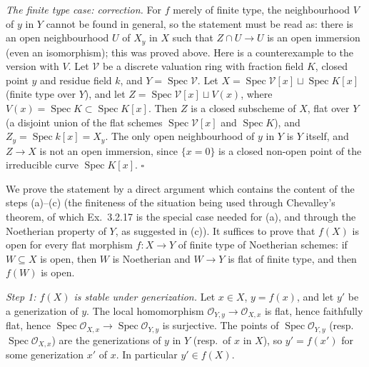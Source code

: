 \documentclass[11pt]{article}
\begin{document}
\emph{The finite type case: correction.} For $f$ merely of finite type, the neighbourhood $V$ of $y$ in $Y$ cannot be found in general, so the statement must be read as: there is an open neighbourhood $U$ of $X_y$ in $X$ such that $Z\cap U\to U$ is an open immersion (even an isomorphism); this was proved above. Here is a counterexample to the version with $V$. Let $\mathcal V$ be a discrete valuation ring with fraction field $K$, closed point $y$ and residue field $k$, and $Y=\operatorname{Spec}\mathcal V$. Let $X=\operatorname{Spec}\mathcal V[x]\sqcup\operatorname{Spec}K[x]$ (finite type over $Y$), and let $Z=\operatorname{Spec}\mathcal V[x]\sqcup V(x)$, where $V(x)=\operatorname{Spec}K\subset\operatorname{Spec}K[x]$. Then $Z$ is a closed subscheme of $X$, flat over $Y$ (a disjoint union of the flat schemes $\operatorname{Spec}\mathcal V[x]$ and $\operatorname{Spec}K$), and $Z_y=\operatorname{Spec}k[x]=X_y$. The only open neighbourhood of $y$ in $Y$ is $Y$ itself, and $Z\to X$ is not an open immersion, since $\{x=0\}$ is a closed non-open point of the irreducible curve $\operatorname{Spec}K[x]$. \hfill$\square$

\pf
We prove the statement by a direct argument which contains the content of the steps (a)--(c) (the finiteness of the situation being used through Chevalley's theorem, of which Ex.~3.2.17 is the special case needed for (a), and through the Noetherian property of $Y$, as suggested in (c)). It suffices to prove that $f(X)$ is open for every flat morphism $f:X\to Y$ of finite type of Noetherian schemes: if $W\subseteq X$ is open, then $W$ is Noetherian and $W\to Y$ is flat of finite type, and then $f(W)$ is open.

\emph{Step 1: $f(X)$ is stable under generization.} Let $x\in X$, $y=f(x)$, and let $y'$ be a generization of $y$. The local homomorphism $\mathcal O_{Y,y}\to\mathcal O_{X,x}$ is flat, hence faithfully flat, hence $\operatorname{Spec}\mathcal O_{X,x}\to\operatorname{Spec}\mathcal O_{Y,y}$ is surjective. The points of $\operatorname{Spec}\mathcal O_{Y,y}$ (resp.\ $\operatorname{Spec}\mathcal O_{X,x}$) are the generizations of $y$ in $Y$ (resp.\ of $x$ in $X$), so $y'=f(x')$ for some generization $x'$ of $x$. In particular $y'\in f(X)$.
\end{document}
